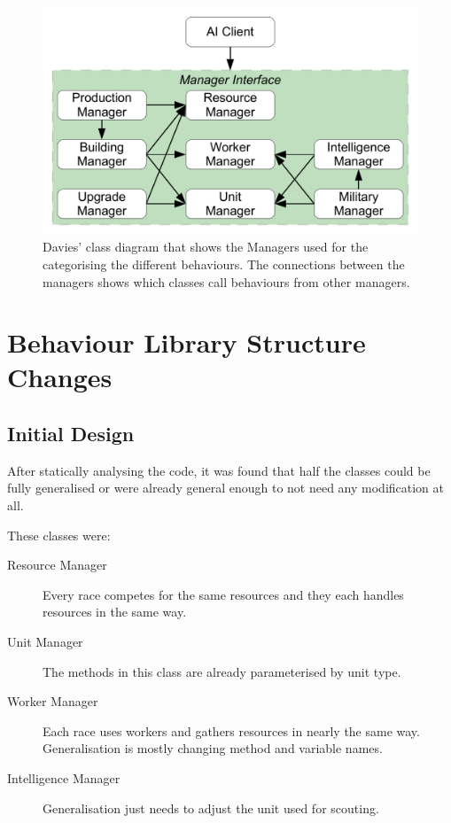 \documentclass[11pt,openright,a4paper]{report}
\begin{document}
\begin{figure}[h]
    \centering
    \includegraphics[scale=0.5]{OrigClassDia}
    \caption{Davies' class diagram that shows the Managers used for the categorising the different behaviours. The connections between the managers shows which classes call behaviours from other managers.\protect\cite{davies2012}}
    \label{fig:SimonClassDia}
\end{figure}

\section{Behaviour Library Structure Changes}
\subsection{Initial Design}
After statically analysing the code, it was found that half the classes could be fully generalised or were already general enough to not need any modification at all.

These classes were:
\begin{description}
\item[Resource Manager]Every race competes for the same resources and they each handles resources in the same way.
\item[Unit Manager]The methods in this class are already parameterised by unit type.
\item[Worker Manager]Each race uses workers and gathers resources in nearly the same way. Generalisation is mostly changing method and variable names.
\item[Intelligence Manager]Generalisation just needs to adjust the unit used for scouting.
\end{description}
\end{document}
